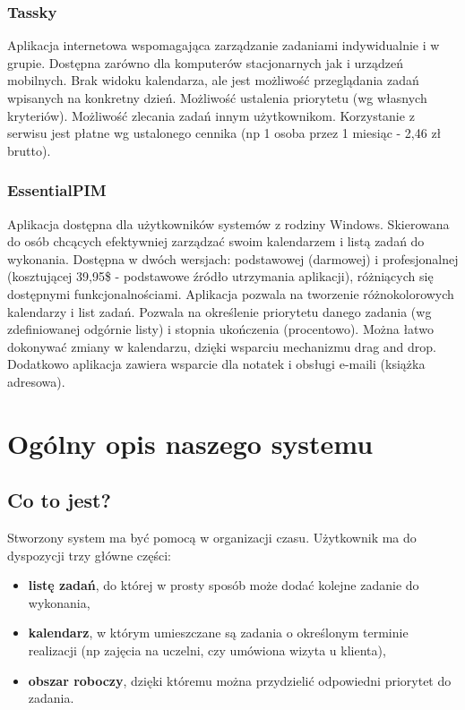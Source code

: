 \documentclass[pdflatex,11pt]{aghdpl}
\begin{document}
\subsection{Tassky}

Aplikacja internetowa wspomagająca zarządzanie zadaniami indywidualnie i w grupie. Dostępna zarówno dla komputerów stacjonarnych jak i urządzeń mobilnych. Brak widoku kalendarza, ale jest możliwość przeglądania zadań wpisanych na konkretny dzień. Możliwość ustalenia priorytetu (wg własnych kryteriów). Możliwość zlecania zadań innym użytkownikom. Korzystanie z serwisu jest płatne wg ustalonego cennika (np 1 osoba przez 1 miesiąc - 2,46 zł brutto).

\subsection{EssentialPIM}
Aplikacja dostępna dla użytkowników systemów z rodziny Windows. Skierowana do osób chcących efektywniej zarządzać swoim kalendarzem i listą zadań do wykonania. Dostępna w dwóch wersjach: podstawowej (darmowej) i profesjonalnej (kosztującej 39,95\$ - podstawowe źródło utrzymania aplikacji), różniących się dostępnymi funkcjonalnościami. Aplikacja pozwala na tworzenie różnokolorowych kalendarzy i list zadań. Pozwala na określenie priorytetu danego zadania (wg zdefiniowanej odgórnie listy) i stopnia ukończenia (procentowo). Można łatwo dokonywać zmiany w kalendarzu, dzięki wsparciu mechanizmu drag and drop. Dodatkowo aplikacja zawiera wsparcie dla notatek i obsługi e-maili (książka adresowa).



\chapter{Ogólny opis naszego systemu}

\section{Co to jest?}

Stworzony system ma być pomocą w organizacji czasu. Użytkownik ma do dyspozycji trzy główne części:
\begin{itemize}
\item \textbf{listę zadań}, do której w prosty sposób może dodać kolejne zadanie do wykonania,
\item \textbf{kalendarz}, w którym umieszczane są zadania o określonym terminie realizacji (np zajęcia na uczelni, czy umówiona wizyta u klienta),
\item \textbf{obszar roboczy}, dzięki któremu można przydzielić odpowiedni priorytet do zadania.
\end{itemize}
\end{document}
